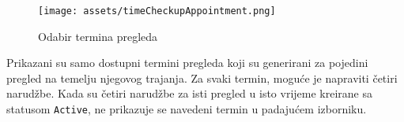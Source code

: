 \begin{figure}[H]
	\texttt{[image: assets/timeCheckupAppointment.png]}
	\centering
	\caption{Odabir termina pregleda}
	\label{fig:timeCheckupAppointment}
\end{figure}

Prikazani su samo dostupni termini pregleda koji su generirani za pojedini pregled na temelju njegovog trajanja. Za svaki termin, moguće je napraviti četiri narudžbe. Kada su četiri narudžbe za isti pregled u isto vrijeme kreirane sa statusom \texttt{Active}, ne prikazuje se navedeni termin u padajućem izborniku.